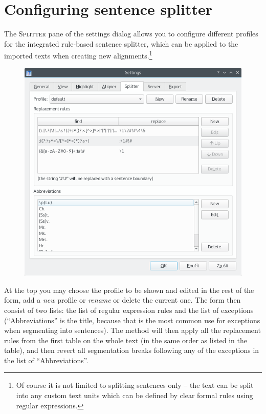 \documentclass[a4paper,10pt,oneside]{book}
\newcommand{\menu}[1]{\textsc{#1}}
\begin{document}
\section{Configuring sentence splitter}\label{ch:detail:config:splitter}

The \menu{Splitter} pane of the settings dialog allows you to configure different profiles for the integrated rule-based sentence splitter, which can be applied to the imported texts when creating new alignments.\footnote{Of course it is not limited to splitting sentences only -- the text can be split into any custom text units which can be defined by clear formal rules using regular expressions.}

\begin{figure}[htbf]
 \includegraphics[width=\textwidth]{screenshots/settings_splitter.png}
\end{figure}

At the top you may choose the profile to be shown and edited in the rest of the form, add a \emph{new} profile or \emph{rename} or delete the current one. The form then consist of two lists: the list of regular expression rules and the list of exceptions (``Abbreviations'' is the title, because that is the most common use for exceptions when segmenting into sentences). The method will then apply all the replacement rules from the first table on the whole text (in the same order as listed in the table), and then revert all segmentation breaks following any of the exceptions in the list of ``Abbreviations''.
\end{document}
